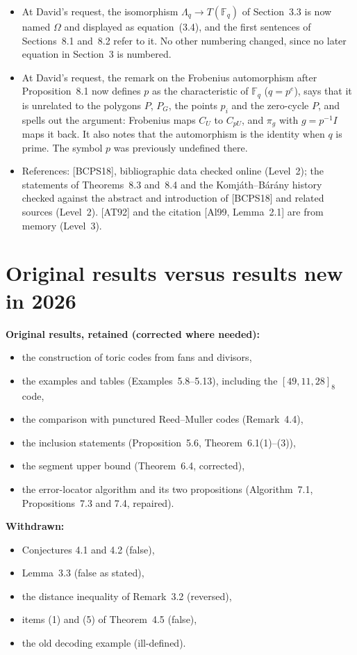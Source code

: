 \documentclass[12pt,letterpaper]{article}
\newcommand{\F}{\mathbb{F}}
\begin{document}
\begin{itemize}[leftmargin=*]
becomes 8.14. References to these numbers in Sections~\ref{sec:draft3}
and~\ref{sec:draft4} of this log use the older numbering.
\item At David's request, the isomorphism $\Lambda_q\to T(\F_q)$ of Section~3.3 is
now named $\Omega$ and displayed as equation~(3.4), and the first sentences
of Sections~8.1 and~8.2 refer to it. No other numbering changed, since no
later equation in Section~3 is numbered.
\item At David's request, the remark on the Frobenius automorphism after
Proposition~8.1 now defines $p$ as the characteristic of $\F_q$ ($q=p^e$),
says that it is unrelated to the polygons $P$, $P_G$, the points $p_i$ and
the zero-cycle $P$, and spells out the argument: Frobenius maps $C_U$ to
$C_{pU}$, and $\pi_g$ with $g=p^{-1}I$ maps it back. It also notes that the
automorphism is the identity when $q$ is prime. The symbol $p$ was previously
undefined there.
\item References: [BCPS18], bibliographic data checked online (Level~2); the
statements of Theorems~8.3 and~8.4 and the Komj\'ath--B\'ar\'any history
checked against the abstract and introduction of [BCPS18] and related
sources (Level~2). [AT92] and the citation [Al99, Lemma~2.1] are from memory
(Level~3).
\end{itemize}

\section{Original results versus results new in 2026}

\textbf{Original results, retained (corrected where needed):}
\begin{itemize}[leftmargin=*,itemsep=0pt]
\item the construction of toric codes from fans and divisors,
\item the examples and tables (Examples~5.8--5.13), including the
$[49,11,28]_8$ code,
\item the comparison with punctured Reed--Muller codes (Remark~4.4),
\item the inclusion statements (Proposition~5.6, Theorem~6.1(1)--(3)),
\item the segment upper bound (Theorem~6.4, corrected),
\item the error-locator algorithm and its two propositions
(Algorithm~7.1, Propositions~7.3 and 7.4, repaired).
\end{itemize}

\textbf{Withdrawn:}
\begin{itemize}[leftmargin=*,itemsep=0pt]
\item Conjectures 4.1 and 4.2 (false),
\item Lemma~3.3 (false as stated),
\item the distance inequality of Remark~3.2 (reversed),
\item items (1) and (5) of Theorem~4.5 (false),
\item the old decoding example (ill-defined).
\end{itemize}
\end{document}
